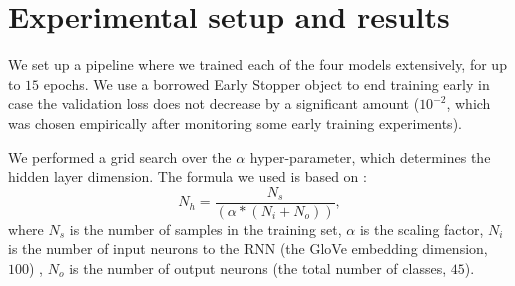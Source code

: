 \documentclass[11pt]{article}
\begin{document}
\begin{table}[htb]
\caption{Layer sequences of the four models (from top to bottom). The input dimension is a one-hot encoded tensor which identifies the input token. The output consists of one activation for each POS to predict. All recurrent layers are bidirectional.}
\label{tab:baselinearch}

\end{table}




\section{Experimental setup and results}
\label{sec:results}
We set up a pipeline where we trained each of the four models extensively, for up to $15$ epochs. We use a borrowed Early Stopper object to end training early in case the validation loss does not decrease by a significant amount ($10^{-2}$, which was chosen empirically after monitoring some early training experiments). 

We performed a grid search over the $\alpha$ hyper-parameter, which determines the hidden layer dimension. The formula we used is based on \cite{hidden_dim_func}:
$$N_h = \frac{N_s}{(\alpha * (N_i + N_o))},$$ where $N_s$ is the number of samples in the training set, $\alpha$ is the scaling factor, $N_i$ is the number of input neurons to the RNN (the GloVe embedding dimension, $100$) , $N_o$ is the number of output neurons (the total number of classes, $45$).
\end{document}
